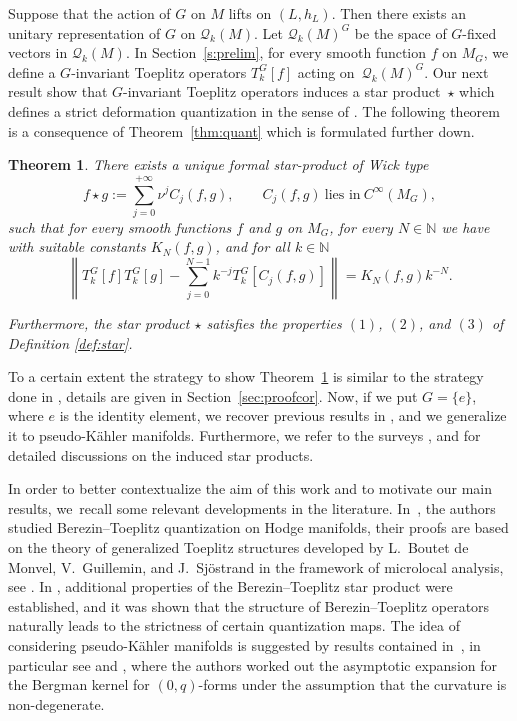 \documentclass[pdftex]{sigma}
\numberwithin{equation}{section}
\newtheorem{Theorem}{Theorem}[section]
\begin{document}
	
	 Suppose that the action of $G$ on $M$ lifts on $(L,h_L)$. Then there exists an unitary representation of $G$ on $\mathcal{Q}_k(M)$. Let $\mathcal{Q}_k(M)^G$ be the space of $G$-fixed vectors in $\mathcal{Q}_k(M)$. In Section~\ref{s:prelim}, for every smooth function $f$ on $M_G$, we define a $G$-invariant Toeplitz operators $T^G_k[f]$ acting on~$\mathcal{Q}_k(M)^G$. Our next result show that $G$-invariant Toeplitz operators induces a star product~$\star$ which defines a strict deformation quantization in the sense of \cite[Chapter 2]{l}. The following theorem is a consequence of Theorem~\ref{thm:quant} which is formulated further down.
	
\begin{Theorem} \label{cor}
There exists a unique formal star-product of Wick type
\[f\star g := \sum_{j=0}^{+\infty}\nu^j C_j(f, g) ,\qquad C_j(f, g)\ \text{lies in} \ C^{\infty}(M_G), \]
such that for every smooth functions $f$ and $g$ on $M_G$, for every $N\in \mathbb{N}$ we have with suitable constants $K_N(f, g)$, and for all $k\in \mathbb{N}$
\begin{equation} \label{eq:cond}
\left\lVert T^G_k[f] T^G_k[g]-\sum_{j=0}^{N-1} k^{-j} T^G_k[C_j(f,g)]\right \rVert=K_N(f, g) k^{-N} .
\end{equation}
	 	
Furthermore, the star product $\star$ satisfies the properties $(1)$, $(2)$, and $(3)$ of Definition {\rm\ref{def:star}}.
\end{Theorem}

To a certain extent the strategy to show Theorem~\ref{cor} is similar to the strategy done in \cite{schl1}, details are given in Section~\ref{sec:proofcor}. Now, if we put $G=\{e\}$, where $e$ is the identity element, we recover previous results in \cite{schl1}, and we generalize it to pseudo-K\"ahler manifolds. Furthermore, we refer to the surveys \cite{ks,schl2}, and \cite{w} for detailed discussions on the induced star products.
	
In order to better contextualize the aim of this work and to motivate our main results, we~recall some relevant developments in the literature. In~\cite{bms}, the authors studied Berezin--Toeplitz quantization on Hodge manifolds, their proofs are based on the theory of generalized Toeplitz structures developed by L.~Boutet de Monvel, V.~Guillemin, and J.~Sj\"ostrand in the framework of microlocal analysis, see \cite{boutet-guillemin}. In \cite{schl2}, additional properties of the Berezin--Toeplitz star product were established, and it was shown that the structure of Berezin--Toeplitz operators naturally leads to the strictness of certain quantization maps. The idea of considering pseudo-K\"ahler manifolds is suggested by results contained in~\cite{hsma,mm}, in particular see \cite[Theorem~1.7]{mm06} and \cite[Section~8.2]{mm}, where the authors worked out the asymptotic expansion for the Bergman kernel for $(0,q)$-forms under the assumption that the curvature is non-degenerate.
	
\end{document}
